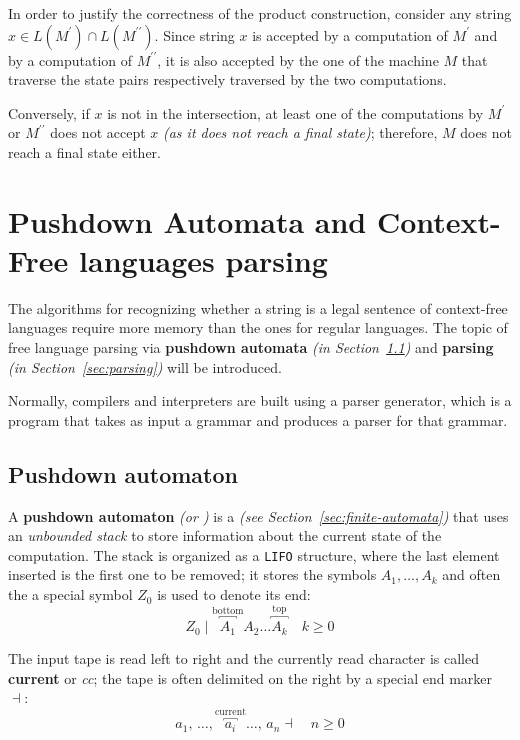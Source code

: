 \documentclass[english]{article}
\begin{document}
\bigskip
In order to justify the correctness of the product construction, consider any string \(x \in L(M^\prime) \cap L(M^{\prime\prime})\).
Since string \(x\) is accepted by a computation of \(M^\prime\) and by a computation of \(M^{\prime\prime}\), it is also accepted by the one of the machine \(M\) that traverse the state pairs respectively traversed by the two computations.

Conversely, if \(x\) is not in the intersection, at least one of the computations by \(M^\prime\) or \(M^{\prime\prime}\) does not accept \(x\) \textit{(as it does not reach a final state)};
therefore, \(M\) does not reach a final state either.

\clearpage

\section{Pushdown Automata and Context-Free languages parsing}

The algorithms for recognizing whether a string is a legal sentence of context-free languages require more memory than the ones for regular languages.
The topic of free language parsing via \textbf{pushdown automata} \textit{(in Section~\ref{sec:pushdown-automaton})} and \textbf{parsing} \textit{(in Section~\ref{sec:parsing})} will be introduced.

Normally, compilers and interpreters are built using a parser generator, which is a program that takes as input a grammar and produces a parser for that grammar.

\subsection{Pushdown automaton}
\label{sec:pushdown-automaton}

A \textbf{pushdown automaton} \textit{(or \PDA)} is a \FSA \textit{(see Section~\ref{sec:finite-automata})} that uses an \textit{unbounded stack} to store information about the current state of the computation.
The stack is organized as a \texttt{LIFO} structure, where the last element inserted is the first one to be removed;
it stores the symbols \(A_1, \ldots, A_k\) and often the a special symbol \(Z_0\) is used to denote its end:
\[ Z_0 \mid \overbracket{A_1}^\text{bottom} A_2 \ldots \overbracket{A_k}^\text{top} \quad k \geq 0\]

The input tape is read left to right and the currently read character is called \textbf{current} or \textit{cc};
the tape is often delimited on the right by a special end marker \(\dashv\):
\[ a_1, \, \ldots, \overbracket{a_i}^{\text{current}} \ldots, \, a_n \dashv \quad n \geq 0 \]
\end{document}

